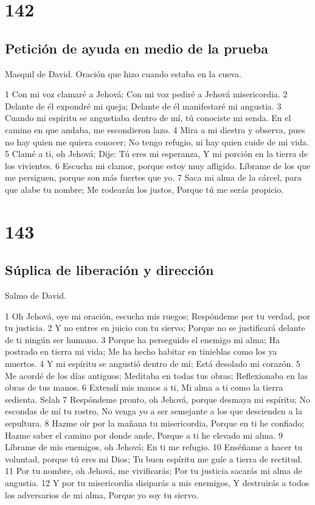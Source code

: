 \chapter{142}

\section*{Petición de ayuda en medio de la prueba}

Masquil de David. Oración que hizo cuando estaba en la cueva.

1 Con mi voz clamaré a Jehová;
Con mi voz pediré a Jehová misericordia.
2 Delante de él expondré mi queja;
Delante de él manifestaré mi angustia.
3 Cuando mi espíritu se angustiaba dentro de mí, tú conociste mi senda.
En el camino en que andaba, me escondieron lazo.
4 Mira a mi diestra y observa, pues no hay quien me quiera conocer;
No tengo refugio, ni hay quien cuide de mi vida.
5 Clamé a ti, oh Jehová;
Dije: Tú eres mi esperanza,
Y mi porción en la tierra de los vivientes.
6 Escucha mi clamor, porque estoy muy afligido.
Líbrame de los que me persiguen, porque son más fuertes que yo.
7 Saca mi alma de la cárcel, para que alabe tu nombre;
Me rodearán los justos,
Porque tú me serás propicio.

\chapter{143}

\section*{Súplica de liberación y dirección}

Salmo de David.

1 Oh Jehová, oye mi oración, escucha mis ruegos;
Respóndeme por tu verdad, por tu justicia.
2 Y no entres en juicio con tu siervo;
Porque no se justificará delante de ti ningún ser humano.
3 Porque ha perseguido el enemigo mi alma;
Ha postrado en tierra mi vida;
Me ha hecho habitar en tinieblas como los ya muertos.
4 Y mi espíritu se angustió dentro de mí;
Está desolado mi corazón.
5 Me acordé de los días antiguos;
Meditaba en todas tus obras;
Reflexionaba en las obras de tus manos.
6 Extendí mis manos a ti,
Mi alma a ti como la tierra sedienta. Selah
7 Respóndeme pronto, oh Jehová, porque desmaya mi espíritu;
No escondas de mí tu rostro,
No venga yo a ser semejante a los que descienden a la sepultura.
8 Hazme oír por la mañana tu misericordia,
Porque en ti he confiado;
Hazme saber el camino por donde ande,
Porque a ti he elevado mi alma.
9 Líbrame de mis enemigos, oh Jehová;
En ti me refugio.
10 Enséñame a hacer tu voluntad, porque tú eres mi Dios;
Tu buen espíritu me guíe a tierra de rectitud.
11 Por tu nombre, oh Jehová, me vivificarás;
Por tu justicia sacarás mi alma de angustia.
12 Y por tu misericordia disiparás a mis enemigos,
Y destruirás a todos los adversarios de mi alma,
Porque yo soy tu siervo.

